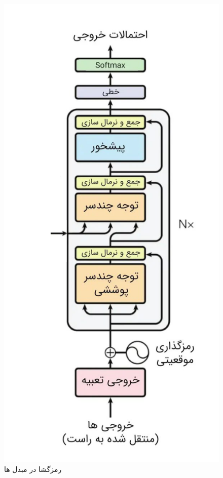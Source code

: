 \begin{figure}[h]
	\centering
	\begin{minipage}[b]{0.31\textwidth}
		\centering
		\includegraphics[width=\textwidth]{transformer_images/persian images/b06.png}
		\caption{رمزگشا در مبدل ها}
		\label{fig:Decoder}
	\end{minipage}
	\hfill
\end{figure}

